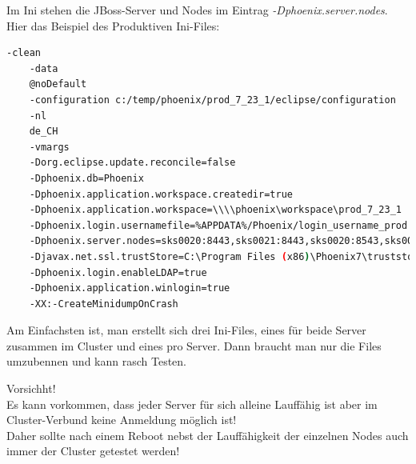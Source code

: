 \begin{flushleft}
\end{flushleft}
\begin{flushleft}
    Im Ini stehen die \Gls{JBoss}-Server und Nodes im Eintrag \textit{-Dphoenix.server.nodes}.
    Hier das Beispiel des Produktiven Ini-Files:
    \lstset{style=gra_codestyle}
    \begin{lstlisting}[language=sh, caption=Workstation.ini PROD Beispiel,captionpos=b,label={lst:workstation.ini-prod-beispiel},breaklines=true]
    -clean
    -data
    @noDefault
    -configuration c:/temp/phoenix/prod_7_23_1/eclipse/configuration
    -nl
    de_CH
    -vmargs
    -Dorg.eclipse.update.reconcile=false
    -Dphoenix.db=Phoenix
    -Dphoenix.application.workspace.createdir=true
    -Dphoenix.application.workspace=\\\\phoenix\workspace\prod_7_23_1
    -Dphoenix.login.usernamefile=%APPDATA%/Phoenix/login_username_prod
    -Dphoenix.server.nodes=sks0020:8443,sks0021:8443,sks0020:8543,sks0021:8543
    -Djavax.net.ssl.trustStore=C:\Program Files (x86)\Phoenix7\truststore.jks
    -Dphoenix.login.enableLDAP=true
    -Dphoenix.application.winlogin=true
    -XX:-CreateMinidumpOnCrash
    \end{lstlisting}
\end{flushleft}
\begin{flushleft}
    Am Einfachsten ist, man erstellt sich drei Ini-Files, eines für beide Server zusammen im Cluster und eines pro Server.
    Dann braucht man nur die Files umzubennen und kann rasch Testen.
\end{flushleft}
\begin{flushleft}
    \begin{mdframed}
    Vorsichht!\\Es kann vorkommen, dass jeder Server für sich alleine Lauffähig ist aber im Cluster-Verbund keine Anmeldung möglich ist!\\
    Daher sollte nach einem Reboot nebst der Lauffähigkeit der einzelnen Nodes auch immer der Cluster getestet werden!
    \end{mdframed}
\end{flushleft}
\begin{flushleft}

\end{flushleft}